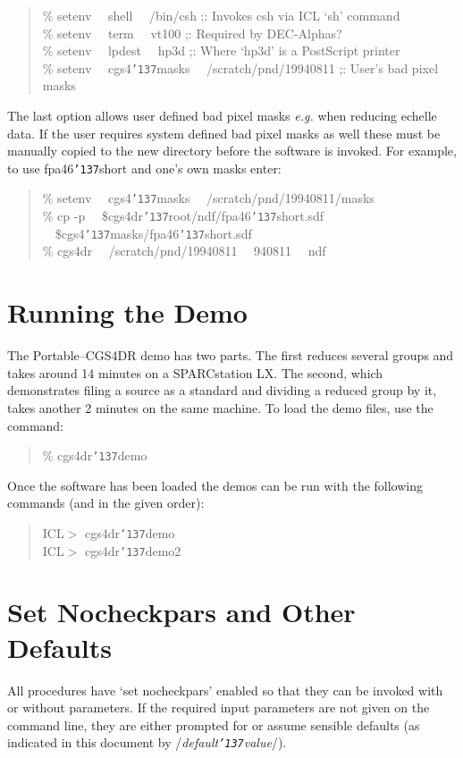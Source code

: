 \documentclass[a4paper]{book}
\renewcommand{\_}{{\tt\char'137}}
\begin{document}
\begin{quote}
 \% setenv \ \ {\sc shell} \ \ /bin/csh \hfill ;: Invokes csh via ICL `sh' command \\
 \% setenv \ \ {\sc term} \ \ vt100     \hfill ;: Required by DEC-Alphas? \\
 \% setenv \ \ {\sc lpdest} \ \ hp3d    \hfill ;: Where `hp3d' is a PostScript printer \\
 \% setenv \ \ {\sc cgs4\_masks} \ \ /scratch/pnd/19940811 \hfill ;: User's bad pixel masks
\end{quote}

The last option allows user defined bad pixel masks {\em e.g.}
when reducing echelle data. If the user requires system defined bad pixel
masks as well these must be manually copied to the new directory before the
software is invoked. For example, to use fpa46\_short and one's own masks
enter:

\begin{quote}
 \% setenv \ \ {\sc cgs4\_masks} \ \ /scratch/pnd/19940811/masks \\
 \% cp -p \ \ {\sc \${cgs4dr\_root}}/ndf/fpa46\_short.sdf \ \ {\sc \${cgs4\_masks}}/fpa46\_short.sdf \\
 \% cgs4dr \ \ /scratch/pnd/19940811 \ \ 940811 \ \ ndf
\end{quote}

\section{Running the Demo}
The Portable--CGS4DR demo has two parts. The first reduces several groups
and takes around 14 minutes on a SPARCstation LX. The second, which
demonstrates filing a source as a standard and dividing a reduced group by
it, takes another 2 minutes on the same machine. To load the demo files,
use the command:

\begin{quote}
  \% cgs4dr\_demo
\end{quote}

Once the software has been loaded the demos can be run with the following
commands (and in the given order):

\begin{quote}
  ICL$>$ cgs4dr\_demo \\
  ICL$>$ cgs4dr\_demo2
\end{quote}

\section{Set Nocheckpars and Other Defaults}
All procedures have `set nocheckpars' enabled so that they can be invoked
with or without parameters. If the required input parameters are not given
on the command line, they are either prompted for or assume sensible
defaults (as indicated in this document by /{\em default\_value}/).
\end{document}
